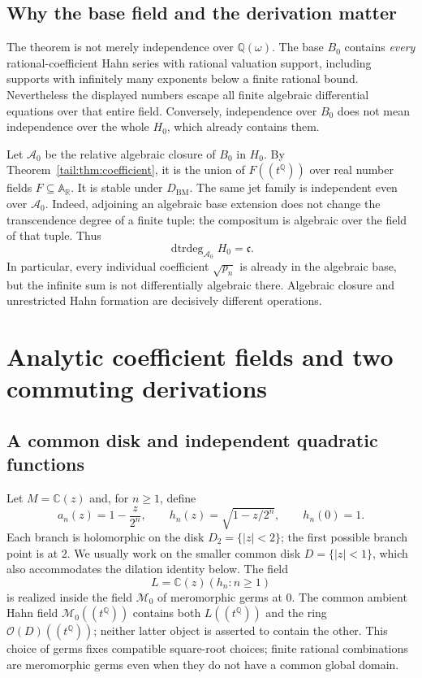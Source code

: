 \documentclass[11pt,a4paper]{article}
\numberwithin{equation}{section}
\theoremstyle{definition}
\theoremstyle{remark}
\newcommand{\R}{\mathbb R}
\newcommand{\C}{\mathbb C}
\newcommand{\Q}{\mathbb Q}
\newcommand{\AR}{\mathbb A_{\R}}
\newcommand{\OO}{\mathcal O}
\newcommand{\dtrdeg}{\operatorname{dtrdeg}}
\newcommand{\BM}{D_{\mathrm{BM}}}
\newcommand{\cf}{\mathfrak c}
\begin{document}
\subsection{Why the base field and the derivation matter}
The theorem is not merely independence over $\Q(\omega)$. The base
$B_0$ contains \emph{every} rational-coefficient Hahn series with rational
valuation support, including supports with infinitely many exponents
below a finite rational bound. Nevertheless the displayed numbers escape
all finite algebraic differential equations over that entire field.
Conversely, independence over $B_0$ does not mean independence over the
whole $H_0$, which already contains them.

Let $\mathcal A_0$ be the relative algebraic closure of $B_0$ in $H_0$.
By Theorem~\ref{tail:thm:coefficient}, it is the union of
$F((t^\Q))$ over real number fields $F\subseteq\AR$. It is stable under
$\BM$. The same jet family is independent even over $\mathcal A_0$.
Indeed, adjoining an algebraic base extension does not change the
transcendence degree of a finite tuple: the compositum is algebraic over
the field of that tuple. Thus
\[
 \dtrdeg_{\mathcal A_0}H_0=\cf.
\]
In particular, every individual coefficient $\sqrt{p_n}$ is already in
the algebraic base, but the infinite sum is not differentially algebraic
there. Algebraic closure and unrestricted Hahn formation are decisively
different operations.

\section{Analytic coefficient fields and two commuting derivations}\label{tail:sec:analyticsetup}

\subsection{A common disk and independent quadratic functions}
Let $M=\C(z)$ and, for $n\geq1$, define
\begin{equation}\label{tail:eq:hn}
 a_n(z)=1-\frac z{2^n},\qquad
 h_n(z)=\sqrt{1-z/2^n},\qquad h_n(0)=1.
\end{equation}
Each branch is holomorphic on the disk $D_2=\{|z|<2\}$; the first
possible branch point is at $2$. We usually work on the smaller common
disk $D=\{|z|<1\}$, which also accommodates the dilation identity below.
The field
\[
 L=\C(z)(h_n:n\geq1)
\]
is realized inside the field $\mathscr M_0$ of meromorphic germs at $0$.
The common ambient Hahn field $\mathscr M_0((t^\Q))$ contains both
$L((t^\Q))$ and the ring $\OO(D)((t^\Q))$; neither latter object is
asserted to contain the other. This choice of germs fixes compatible square-root choices; finite rational
combinations are meromorphic germs even when they do not have a common
global domain.
\end{document}
